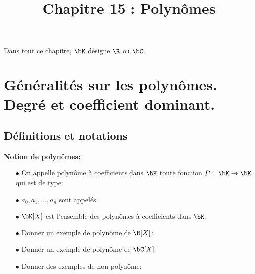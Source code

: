 \documentclass[a4paper, 11pt,reqno]{article}
\begin{document}
\tableofcontents
\title{Chapitre 15  : Polynômes}




\noindent Dans tout ce chapitre, $\bK$ d\'esigne $\R$ ou $\bC$.

\section{G\'en\'eralit\'es sur les polyn\^omes. Degr\'e et coefficient dominant.}

\subsection{D\'efinitions et notations}

{\noindent

	\begin{defi} \textbf{Notion de polyn\^omes:}
		\begin{itemize}
			\item[$\bullet$] On appelle polyn\^ome \`a coefficients dans $\bK$ toute fonction $P:\ \bK\rightarrow\bK$ qui est de type:\\


			\item[$\bullet$] $a_0,a_1,\dots,a_n$ sont appel\'es \dotfill \vsec
			\item[$\bullet$] $\bK[X]$ est l'ensemble des polyn\^omes \`a coefficients dans $\bK$.
		\end{itemize}
	\end{defi}

}


\begin{exemples}
	\begin{itemize}
		\item[$\bullet$] Donner un exemple de polyn\^{o}me de $\R[X]$: \dotfill\vsec
		\item[$\bullet$] Donner un exemple de polyn\^{o}me de $\bC[X]$: \dotfill\vsec
		\item[$\bullet$] Donner des exemples de non polyn\^{o}me: \dotfill\vsec
	\end{itemize}
\end{exemples}
\end{document}
